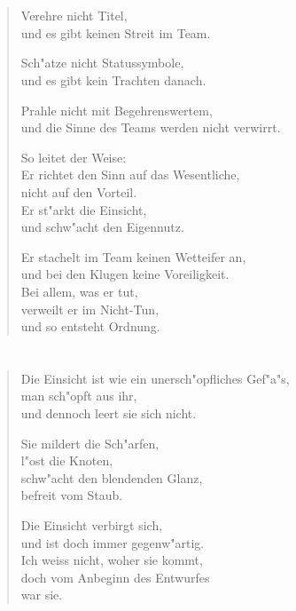 \documentclass[a4paper,10pt,openany]{book}
\begin{document}
\chapter{}
\begin{verse}
Verehre nicht Titel,\\
und es gibt keinen Streit im Team.

Sch"atze nicht Statussymbole,\\
und es gibt kein Trachten danach.

Prahle nicht mit Begehrenswertem,\\
und die Sinne des Teams werden nicht verwirrt.

So leitet der Weise:\\
Er richtet den Sinn auf das Wesentliche,\\
nicht auf den Vorteil.\\
Er st"arkt die Einsicht,\\
und schw"acht den Eigennutz.

Er stachelt im Team keinen Wetteifer an,\\
und bei den Klugen keine Voreiligkeit.\\
Bei allem, was er tut,\\
verweilt er im Nicht-Tun,\\
und so entsteht Ordnung.

\end{verse}

\chapter{}
\begin{verse}
Die Einsicht ist wie ein unersch"opfliches Gef"a"s,\\
man sch"opft aus ihr,\\
und dennoch leert sie sich nicht.

Sie mildert die Sch"arfen,\\
l"ost die Knoten,\\
schw"acht den blendenden Glanz,\\
befreit vom Staub.

Die Einsicht verbirgt sich,\\
und ist doch immer gegenw"artig.\\
Ich weiss nicht, woher sie kommt,\\
doch vom Anbeginn des Entwurfes\\
war sie.
\end{verse}

\end{document}
